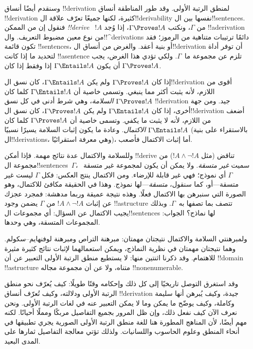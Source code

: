 \documentclass[../../../include/open-logic-section]{subfiles}
\begin{document}


وسنقدم أيضًا أنساق !!{derivation} لمنطق الرتبة الأولى. وقد طور المناطقة
أنساق !!{derivation} كثيرة، لكنها جميعًا تعرّف علاقة ال!!{derivability}
نفسها بين ال!!{sentence}s. فنقول إن من الممكن \emph{!!{derive}}
~$!A$ من $\Gamma$، ونكتب $\Gamma \Proves !A$، إذا وُجد
!!a{derivation} من نوع
معين مضبوط التعريف. وال!!^{derivation}s دائمًا ترتيبات متناهية من
الرموز؛ فقد تكون قائمة !!{sentence}s، أو بنية أعقد. والغرض من أنساق
ال!!{derivation} أن توفر أداة لتحديد ما إذا كانت !!a{sentence} تلزم عن
مجموعة ما~$\Gamma$. ولكي تؤدي هذا الغرض، يجب أن يكون
$\Gamma \Entails !A$ إذا وفقط إذا كان $\Gamma \Proves !A$.

إذا كان $\Gamma \Proves !A$ ولم يكن $\Gamma \Entails !A$، كان نسق
ال!!{derivation} أقوى من اللازم، لأنه يثبت أكثر مما ينبغي. وتسمى
خاصية أن $\Gamma \Entails !A$ كلما كان $\Gamma \Proves !A$
\emph{السلامة}، وهي شرط أدنى في كل نسق !!{derivation} جيد. ومن جهة
أخرى، إذا كان $\Gamma \Entails !A$ ولم يكن $\Gamma \Proves !A$، كان
نسق ال!!{derivation} أضعف من اللازم، لأنه لا يثبت ما يكفي. وتسمى
خاصية أن $\Gamma \Proves !A$ كلما كان $\Gamma \Entails !A$
\emph{الاكتمال}. وعادة ما يكون إثبات السلامة يسيرًا نسبيًا (بالاستقراء
على بنية ال!!{derivation}s، وهي معرفة استقرائيًا)، أما إثبات الاكتمال
فأصعب.

وللسلامة والاكتمال عدة نتائج مهمة. فإذا أمكن !!{derive} تناقض (مثل
$!A \land \lnot !A$) من مجموعة ال!!{sentence}s~$\Gamma$، سميت
\emph{غير متسقة}. ولا يمكن أن يكون
لمجموعة غير متسقة~$\Gamma$ أي نموذج؛ فهي غير قابلة للإرضاء. ومن الاكتمال
ينتج العكس: فكل $\Gamma$ ليست غير متسقة---أو، كما سنقول،
\emph{متسقة}---لها نموذج. وهذا في الحقيقة مكافئ للاكتمال، وهو
الصورة التي سنبرهن بها الاكتمال فعلًا. وهذه نتيجة عميقة وربما مدهشة:
فمجرد عجزك عن إثبات $!A \land \lnot !A$ من $\Gamma$ يضمن وجود
!!a{structure} تتصف بما تصفها به~$\Gamma$. وبذلك يجيب الاكتمال عن
السؤال: أي مجموعات ال!!{sentence}s لها نماذج؟ الجواب: المجموعات
المتسقة، وهي وحدها.

ولمبرهنتي السلامة والاكتمال نتيجتان مهمتان: مبرهنة التراص ومبرهنة
لوفنهايم--سكولم. وهما نتيجتان مهمتان في نظرية النماذج، ويمكن استعمالهما
لإثبات نتائج كثيرة مثيرة للاهتمام. وقد ذكرنا اثنتين منها: لا يستطيع
منطق الرتبة الأولى التعبير عن أن !!{domain} !!a{structure} متناه، ولا
عن أن مجموعة مجاله !!{nonenumerable}.

وقد استغرق التوصل تاريخيًا إلى كل ذلك وإحكامه وقتًا طويلًا: كيف يُعرّف
نحو منطق الرتبة الأولى ودلالته، وكيف تُعرّف أنساق !!{derivation} جيدة،
وكيف يُبرهن أنها سليمة وكاملة، وكيف يوضّح ما يمكن وما لا يمكن التعبير
عنه في لغات الرتبة الأولى. ونحن نعرف الآن كيف نفعل ذلك، وإن ظل المرور
بجميع التفاصيل مربكًا ومملًا أحيانًا. لكنه مهم أيضًا، لأن المناهج
المطورة هنا للغة منطق الرتبة الأولى الصورية يجري تطبيقها في أنحاء المنطق وعلوم
الحاسوب واللسانيات. ولذلك تؤتي معالجة التفاصيل ثمارها على المدى
البعيد.
\end{document}
